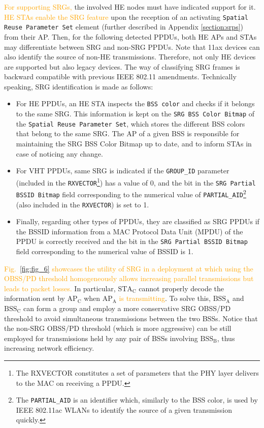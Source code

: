\documentclass{ieeeaccess}
\begin{document}
\textcolor{orange}{For supporting SRGs,} the involved HE nodes must have indicated support for it. \textcolor{orange}{HE STAs enable the SRG feature} upon the reception of an activating \texttt{Spatial Reuse Parameter Set} element (further described in Appendix \ref{section:srps}) from their AP. Then, for the following detected PPDUs, both HE APs and STAs may differentiate between SRG and non-SRG PPDUs. Note that 11ax devices can also identify the source of non-HE transmissions. Therefore, not only HE devices are supported but also legacy devices. The way of classifying SRG frames is backward compatible with previous IEEE 802.11 amendments. Technically speaking, SRG identification is made as follows:
\begin{itemize}
	\item For HE PPDUs, an HE STA inspects the \texttt{BSS color} and checks if it belongs to the same SRG. This information is kept on the \texttt{SRG BSS Color Bitmap} of the \texttt{Spatial Reuse Parameter Set}, which stores the different BSS colors that belong to the same SRG. The AP of a given BSS is responsible for maintaining the SRG BSS Color Bitmap up to date, and to inform STAs in case of noticing any change.
    \item For VHT PPDUs, same SRG is indicated if the \texttt{GROUP\_ID} parameter (included in the \texttt{RXVECTOR}\footnote{The RXVECTOR constitutes a set of parameters that the PHY layer delivers to the MAC on receiving a PPDU.}) has a value of 0, and the bit in the \texttt{SRG Partial BSSID Bitmap} field corresponding to the numerical value of \texttt{PARTIAL\_AID}\footnote{The \texttt{PARTIAL\_AID} is an identifier which, similarly to the BSS color, is used by IEEE 802.11ac WLANs to identify the source of a given transmission quickly.} (also included in the \texttt{RXVECTOR}) is set to 1. 
	\item Finally, regarding other types of PPDUs, they are classified as SRG PPDUs if the BSSID information from a MAC Protocol Data Unit (MPDU) of the PPDU is correctly received and the bit in the \texttt{SRG Partial BSSID Bitmap} field corresponding to the numerical value of BSSID is 1.
\end{itemize}

\textcolor{orange}{Fig.~\ref{fig:fig_6} showcases the utility of SRG in a deployment at which using the OBSS/PD threshold homogeneously allows increasing parallel transmissions but leads to packet losses.} In particular, $\text{STA}_\text{C}$ cannot properly decode the information sent by $\text{AP}_\text{C}$ when $\text{AP}_\text{A}$ \textcolor{orange}{is transmitting}. To solve this, $\text{BSS}_\text{A}$ and $\text{BSS}_\text{C}$ can form a group and employ a more conservative SRG OBSS/PD threshold to avoid simultaneous transmissions between the two BSSs. Notice that the non-SRG OBSS/PD threshold (which is more aggressive) can be still employed for transmissions held by any pair of BSSs involving $\text{BSS}_\text{B}$, thus increasing network efficiency. %
\end{document}
